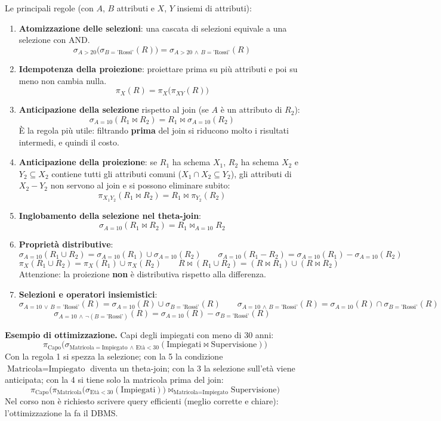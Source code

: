 \documentclass[12pt]{extarticle}
\begin{document}
\medskip
\noindent Le principali regole (con $A$, $B$ attributi e $X$, $Y$ insiemi di attributi):
\begin{enumerate}
    \item \textbf{Atomizzazione delle selezioni}: una cascata di selezioni equivale a una selezione con AND.
    \[
    \sigma_{A > 20}\big(\sigma_{B = \text{'Rossi'}}(R)\big) = \sigma_{A > 20 \,\wedge\, B = \text{'Rossi'}}(R)
    \]
    \item \textbf{Idempotenza della proiezione}: proiettare prima su più attributi e poi su meno non cambia nulla.
    \[
    \pi_X(R) = \pi_X\big(\pi_{XY}(R)\big)
    \]
    \item \textbf{Anticipazione della selezione} rispetto al join (se $A$ è un attributo di $R_2$):
    \[
    \sigma_{A = 10}(R_1 \bowtie R_2) = R_1 \bowtie \sigma_{A = 10}(R_2)
    \]
    È la regola più utile: filtrando \textbf{prima} del join si riducono molto i risultati intermedi, e quindi il costo.
    \item \textbf{Anticipazione della proiezione}: se $R_1$ ha schema $X_1$, $R_2$ ha schema $X_2$ e $Y_2 \subseteq X_2$ contiene tutti gli attributi comuni ($X_1 \cap X_2 \subseteq Y_2$), gli attributi di $X_2 - Y_2$ non servono al join e si possono eliminare subito:
    \[
    \pi_{X_1 Y_2}(R_1 \bowtie R_2) = R_1 \bowtie \pi_{Y_2}(R_2)
    \]
    \item \textbf{Inglobamento della selezione nel theta-join}:
    \[
    \sigma_{A = 10}(R_1 \bowtie R_2) = R_1 \bowtie_{A = 10} R_2
    \]
    \item \textbf{Proprietà distributive}:
    \[
    \sigma_{A=10}(R_1 \cup R_2) = \sigma_{A=10}(R_1) \cup \sigma_{A=10}(R_2)
    \qquad
    \sigma_{A=10}(R_1 - R_2) = \sigma_{A=10}(R_1) - \sigma_{A=10}(R_2)
    \]
    \[
    \pi_X(R_1 \cup R_2) = \pi_X(R_1) \cup \pi_X(R_2)
    \qquad
    R \bowtie (R_1 \cup R_2) = (R \bowtie R_1) \cup (R \bowtie R_2)
    \]
    Attenzione: la proiezione \textbf{non} è distributiva rispetto alla differenza.
    \item \textbf{Selezioni e operatori insiemistici}:
    \[
    \sigma_{A=10 \,\vee\, B=\text{'Rossi'}}(R) = \sigma_{A=10}(R) \cup \sigma_{B=\text{'Rossi'}}(R)
    \qquad
    \sigma_{A=10 \,\wedge\, B=\text{'Rossi'}}(R) = \sigma_{A=10}(R) \cap \sigma_{B=\text{'Rossi'}}(R)
    \]
    \[
    \sigma_{A=10 \,\wedge\, \neg(B=\text{'Rossi'})}(R) = \sigma_{A=10}(R) - \sigma_{B=\text{'Rossi'}}(R)
    \]
\end{enumerate}

\noindent \textbf{Esempio di ottimizzazione.} Capi degli impiegati con meno di 30 anni:
\[
\pi_{\text{Capo}}\big(\sigma_{\text{Matricola} = \text{Impiegato} \,\wedge\, \text{Età} < 30}(\text{Impiegati} \bowtie \text{Supervisione})\big)
\]
Con la regola 1 si spezza la selezione; con la 5 la condizione $\text{Matricola} = \text{Impiegato}$ diventa un theta-join; con la 3 la selezione sull'età viene anticipata; con la 4 si tiene solo la matricola prima del join:
\[
\pi_{\text{Capo}}\Big(\pi_{\text{Matricola}}\big(\sigma_{\text{Età} < 30}(\text{Impiegati})\big) \bowtie_{\text{Matricola} = \text{Impiegato}} \text{Supervisione}\Big)
\]
Nel corso non è richiesto scrivere query efficienti (meglio corrette e chiare): l'ottimizzazione la fa il DBMS.
\end{document}
